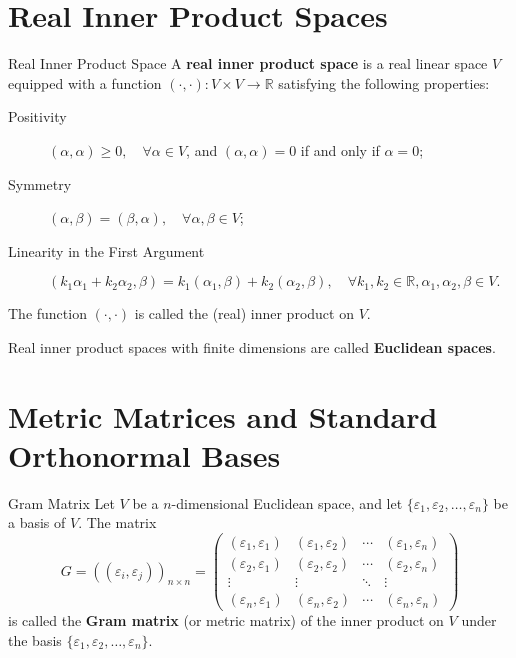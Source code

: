 \documentclass[11pt]{../../TexTemplate/elegantbook} %
\begin{document}
\section{Real Inner Product Spaces}
\begin{definition}{Real Inner Product Space}
    A \textbf{real inner product space} is a real linear space \( V \) 
    equipped with a function \( (\cdot, \cdot): V \times V \to \mathbb{R} \) 
    satisfying the following properties:
    \begin{description}
        \item [Positivity] \( (\alpha, \alpha) \geq 0, \quad \forall \alpha \in V\),
            and \( (\alpha, \alpha) = 0 \) if and only if \( \alpha = 0 \);
        \item [Symmetry] \( (\alpha, \beta) = (\beta, \alpha), \quad \forall \alpha, \beta \in V\);
        \item [Linearity in the First Argument] 
            \( (k_1\alpha_1 + k_2\alpha_2, \beta) = k_1(\alpha_1, \beta) + k_2(\alpha_2, \beta), 
            \quad \forall k_1, k_2 \in \mathbb{R}, 
            \alpha_1, \alpha_2, \beta \in V. \)
    \end{description}
    The function \( (\cdot, \cdot) \) is called the (real) inner product on \( V \).

    Real inner product spaces with finite dimensions are called \textbf{Euclidean spaces}. 
\end{definition}

\section{Metric Matrices and Standard Orthonormal Bases}
\begin{definition}{Gram Matrix}
    Let \( V \) be a \(n\)-dimensional Euclidean space, 
    and let \( \{\varepsilon_1, \varepsilon_2, \dots, \varepsilon_n\} \) be a basis of \( V \).
    The matrix
    \[
    G = ((\varepsilon_i, \varepsilon_j))_{n \times n} =
    \begin{pmatrix}
        (\varepsilon_1, \varepsilon_1) & (\varepsilon_1, \varepsilon_2) & \cdots & (\varepsilon_1, \varepsilon_n) \\
        (\varepsilon_2, \varepsilon_1) & (\varepsilon_2, \varepsilon_2) & \cdots & (\varepsilon_2, \varepsilon_n) \\
        \vdots & \vdots & \ddots & \vdots \\
        (\varepsilon_n, \varepsilon_1) & (\varepsilon_n, \varepsilon_2) & \cdots & (\varepsilon_n, \varepsilon_n)
    \end{pmatrix}
    \]
    is called the \textbf{Gram matrix} (or metric matrix) of the inner product on \( V \)
    under the basis \( \{\varepsilon_1, \varepsilon_2, \dots, \varepsilon_n\} \).
\end{definition}
\end{document}
